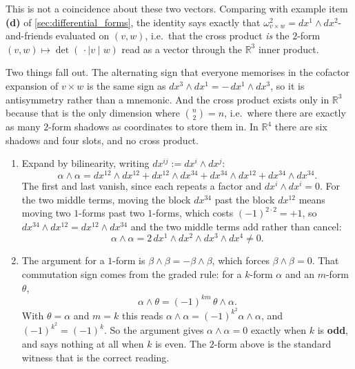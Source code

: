 \begin{exercisesolution}
\begin{remark}
\label{rem:cross_product_is_a_two_form}
This is not a coincidence about these two vectors. Comparing with example item \textbf{(d)} of
\cref{sec:differential_forms}, the identity says exactly that
$\omega^2_{v\times w} = dx^1\wedge dx^2$-and-friends evaluated on $(v,w)$, i.e.\ that the cross
product \emph{is} the $2$-form $(v,w) \mapsto \det(\,\cdot\mid v\mid w)$ read as a vector through
the $\mathbb{R}^3$ inner product.

Two things fall out. The alternating sign that everyone memorises in the cofactor expansion of
$v\times w$ is the same sign as $dx^3\wedge dx^1 = -\,dx^1\wedge dx^3$, so it is antisymmetry
rather than a mnemonic. And the cross product exists only in $\mathbb{R}^3$ because that is the
only dimension where $\binom{n}{2} = n$, i.e.\ where there are exactly as many $2$-form shadows
as coordinates to store them in. In $\mathbb{R}^4$ there are six shadows and four slots, and no
cross product.
\end{remark}
\end{exercisesolution}

\begin{exercisesolution}
\label{sol:ai_wedge_square}
\begin{enumerate}[label=\textbf{(\alph*)}]
  \item Expand by bilinearity, writing $dx^{ij} := dx^i\wedge dx^j$:
    \[\alpha\wedge\alpha = dx^{12}\wedge dx^{12} + dx^{12}\wedge dx^{34} + dx^{34}\wedge dx^{12}
      + dx^{34}\wedge dx^{34}.\]
    The first and last vanish, since each repeats a factor and $dx^i\wedge dx^i = 0$. For the two
    middle terms, moving the block $dx^{34}$ past the block $dx^{12}$ means moving two $1$-forms
    past two $1$-forms, which costs $(-1)^{2\cdot2} = +1$, so $dx^{34}\wedge dx^{12} =
    dx^{12}\wedge dx^{34}$ and the two middle terms add rather than cancel:
    \[\alpha\wedge\alpha = 2\,dx^1\wedge dx^2\wedge dx^3\wedge dx^4 \neq 0.\]
  \item The argument for a $1$-form is $\beta\wedge\beta = -\beta\wedge\beta$, which forces
    $\beta\wedge\beta = 0$. That commutation sign comes from the graded rule: for a $k$-form
    $\alpha$ and an $m$-form $\theta$,
    \[\alpha\wedge\theta = (-1)^{km}\,\theta\wedge\alpha.\]
    With $\theta = \alpha$ and $m = k$ this reads
    $\alpha\wedge\alpha = (-1)^{k^2}\alpha\wedge\alpha$, and $(-1)^{k^2} = (-1)^k$. So the
    argument gives $\alpha\wedge\alpha = 0$ exactly when $k$ is \textbf{odd}, and says nothing at
    all when $k$ is even. The $2$-form above is the standard witness that  is
    the correct reading.
\end{enumerate}
\end{exercisesolution}

